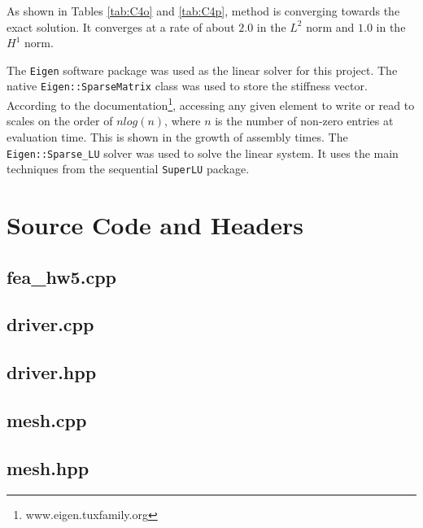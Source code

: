 \documentclass[a4paper, 12pt]{article}
\begin{document}
As shown in Tables \ref{tab:C4o} and \ref{tab:C4p}, 
method is converging towards the exact solution. 
It converges at a rate of about $2.0$ in the $L^2$ norm
and $1.0$ in the $H^1$ norm.

The \texttt{Eigen} software package
was used as the linear solver for this project. 
The native \texttt{Eigen::SparseMatrix} class was used to 
store the stiffness vector.
According to the documentation\footnote{www.eigen.tuxfamily.org}, 
accessing any given element to write or read to 
scales on the order of $nlog(n)$, where $n$ is 
the number of non-zero entries at evaluation time.
This is shown in the growth of assembly times.
The \texttt{Eigen::Sparse\_LU} solver was used to 
solve the linear system.
It uses the main techniques from the sequential
\texttt{SuperLU} package.


\newpage
\appendix
\section{Source Code and Headers} \label{sec:code}

\subsection{fea\_hw5.cpp} \label{subsec:fea_hw5.cpp}


\subsection{driver.cpp} \label{subsec:driver.cpp}

\subsection{driver.hpp} \label{subsec:driver.hpp}


\subsection{mesh.cpp} \label{subsec:mesh.cpp}

\subsection{mesh.hpp} \label{subsec:mesh.hpp}

\end{document}
